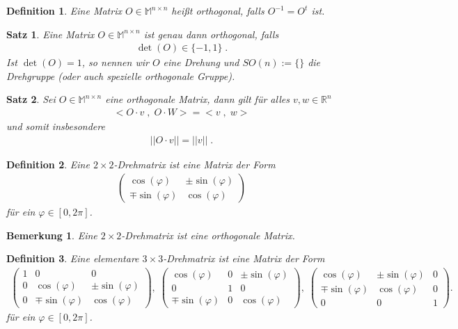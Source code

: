 \documentclass[]{article}
\newtheorem{Definition}{Definition}
\newtheorem{Satz}{Satz}
\newtheorem{Bemerkung}{Bemerkung}
\begin{document}
\begin{Definition}
Eine Matrix $O \in \mathbb{M}^{n \times n}$ heißt orthogonal, falls
$O^{-1} = O^t$ ist. 
\end{Definition}

\begin{Satz}
Eine Matrix $O \in \mathbb{M}^{n \times n}$ ist genau dann  orthogonal, falls
\begin{align*}
\det(O) \in  \{-1, 1 \} \; .
\end{align*}
Ist $\det(O) = 1$, so nennen wir $O$ eine Drehung und 
$SO(n) := \{ \}$ die Drehgruppe (oder auch spezielle orthogonale Gruppe).
\end{Satz}

\begin{Satz}
Sei $O \in \mathbb{M}^{n \times n}$ eine orthogonale Matrix, dann gilt für alles $v,w \in \mathbb{R}^n$
\begin{align*}
< O \cdot v \; , \;  O \cdot W > = <v \; , \; w>
\end{align*}
und somit insbesondere 
\begin{align*}
|| O \cdot v|| = ||v|| \; .
\end{align*}
\end{Satz}


\begin{Definition}
Eine $2 \times 2$-Drehmatrix ist eine Matrix der Form
\begin{align*}
\begin{pmatrix}
\cos(\varphi) & \pm \sin(\varphi) \\  \mp \sin(\varphi) & \cos(\varphi)
\end{pmatrix}
\end{align*}
für ein $\varphi \in [0, 2 \pi]$. 
\end{Definition}

\begin{Bemerkung}
Eine $2 \times 2$-Drehmatrix ist eine orthogonale Matrix.
\end{Bemerkung}



\begin{Definition}
Eine elementare $3 \times 3$-Drehmatrix ist eine Matrix der Form
\begin{align*}
\begin{pmatrix}
1 & 0 & 0 \\
0 & \cos(\varphi) & \pm \sin(\varphi) \\ 
 0 & \mp \sin(\varphi) & \cos(\varphi)
\end{pmatrix}, \;
\begin{pmatrix}
 \cos(\varphi) & 0 &  \pm \sin(\varphi) \\ 
0 & 1 & 0 \\ 
\mp \sin(\varphi) & 0& \cos(\varphi)
\end{pmatrix}, \;
\begin{pmatrix}
 \cos(\varphi) & \pm \sin(\varphi)  & 0\\ 
 \mp \sin(\varphi) & \cos(\varphi) & 0 \\
0 & 0 & 1 
\end{pmatrix}. 
\end{align*} 
für ein $\varphi \in [0, 2 \pi]$. 
\end{Definition}
\end{document}
